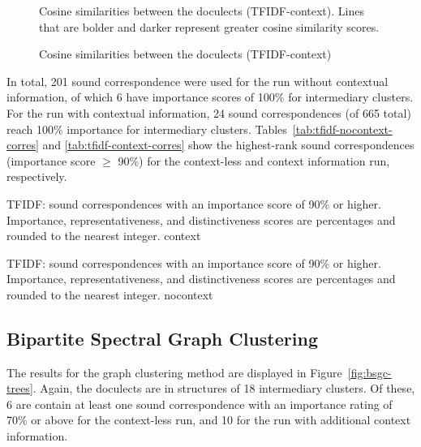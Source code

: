 \documentclass[a4paper]{article}
\begin{document}
% 
\begin{figure}[h]
\centering

\caption
{Cosine similarities between the doculects (TFIDF-context)}
{
Cosine similarities between the doculects (TFIDF-context).
Lines that are bolder and darker represent greater cosine similarity scores.
}
\label{fig:cosine}
\end{figure}

In total, 201 sound correspondence were used for the run without contextual information,
of which 6 have importance scores of 100\% for intermediary clusters.
For the run with contextual information,
24 sound correspondences (of 665 total) reach 100\% importance for intermediary clusters.
Tables~\ref{tab:tfidf-nocontext-corres} and \ref{tab:tfidf-context-corres}
show the highest-rank sound correspondences (importance score $\geq$ 90\%)
for the context-less and context information run, respectively.

\begin{table}[h]
\centering

\caption{TFIDF: sound correspondences with an importance score of 90\% or higher.
Importance, representativeness, and distinctiveness scores are percentages and rounded to the nearest integer.
context
}
\label{tab:tfidf-context-corres}
\end{table}

\begin{table}[h]
\centering

\caption{TFIDF: sound correspondences with an importance score of 90\% or higher.
Importance, representativeness, and distinctiveness scores are percentages and rounded to the nearest integer.
nocontext}
\label{tab:tfidf-nocontext-corres}
\end{table}

\subsection{Bipartite Spectral Graph Clustering}

The results for the graph clustering method are
displayed in Figure~\ref{fig:bsgc-trees}.
Again, the doculects are in structures of 18 intermediary clusters.
Of these, 6 are contain at least one sound correspondence
with an importance rating of 70\% or above for the context-less run,
and 10 for the run with additional context information.
\end{document}
